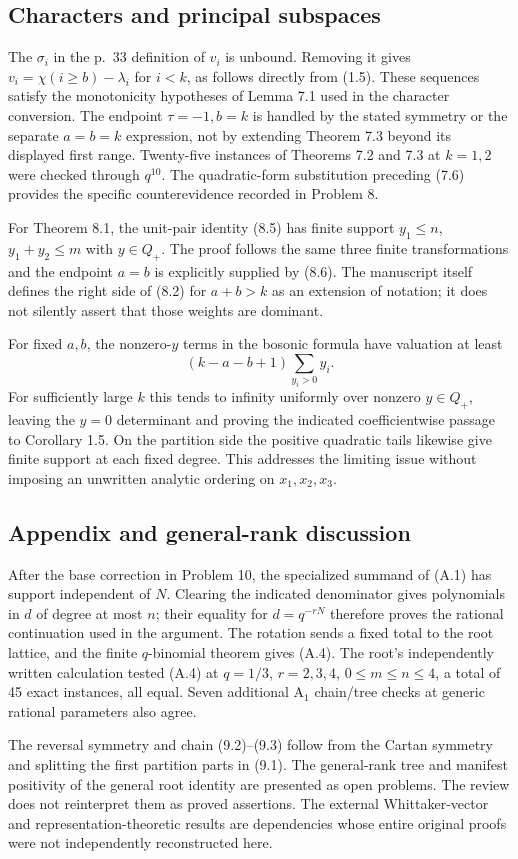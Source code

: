 \documentclass[10pt]{article}
\begin{document}
\subsection*{Characters and principal subspaces}
The \(\sigma_i\) in the p. 33 definition of \(v_i\) is unbound. Removing it gives \(v_i=\chi(i\ge b)-\lambda_i\) for \(i<k\), as follows directly from (1.5). These sequences satisfy the monotonicity hypotheses of Lemma 7.1 used in the character conversion. The endpoint \(\tau=-1,b=k\) is handled by the stated symmetry or the separate \(a=b=k\) expression, not by extending Theorem 7.3 beyond its displayed first range. Twenty-five instances of Theorems 7.2 and 7.3 at \(k=1,2\) were checked through \(q^{10}\). The quadratic-form substitution preceding (7.6) provides the specific counterevidence recorded in Problem 8.\par
For Theorem 8.1, the unit-pair identity (8.5) has finite support \(y_1\le n\), \(y_1+y_2\le m\) with \(y\in Q_+\). The proof follows the same three finite transformations and the endpoint \(a=b\) is explicitly supplied by (8.6). The manuscript itself defines the right side of (8.2) for \(a+b>k\) as an extension of notation; it does not silently assert that those weights are dominant.\par
For fixed \(a,b\), the nonzero-\(y\) terms in the bosonic formula have valuation at least \[(k-a-b+1)\sum_{y_i>0}y_i .\] For sufficiently large \(k\) this tends to infinity uniformly over nonzero \(y\in Q_+\), leaving the \(y=0\) determinant and proving the indicated coefficientwise passage to Corollary 1.5. On the partition side the positive quadratic tails likewise give finite support at each fixed degree. This addresses the limiting issue without imposing an unwritten analytic ordering on \(x_1,x_2,x_3\).\par
\subsection*{Appendix and general-rank discussion}
After the base correction in Problem 10, the specialized summand of (A.1) has support independent of \(N\). Clearing the indicated denominator gives polynomials in \(d\) of degree at most \(n\); their equality for \(d=q^{-rN}\) therefore proves the rational continuation used in the argument. The rotation sends a fixed total to the root lattice, and the finite \(q\)-binomial theorem gives (A.4). The root’s independently written calculation tested (A.4) at \(q=1/3\), \(r=2,3,4\), \(0\le m\le n\le4\), a total of 45 exact instances, all equal. Seven additional \(\mathrm A_1\) chain/tree checks at generic rational parameters also agree.\par
The reversal symmetry and chain (9.2)–(9.3) follow from the Cartan symmetry and splitting the first partition parts in (9.1). The general-rank tree and manifest positivity of the general root identity are presented as open problems. The review does not reinterpret them as proved assertions. The external Whittaker-vector and representation-theoretic results are dependencies whose entire original proofs were not independently reconstructed here.\par
\end{document}
